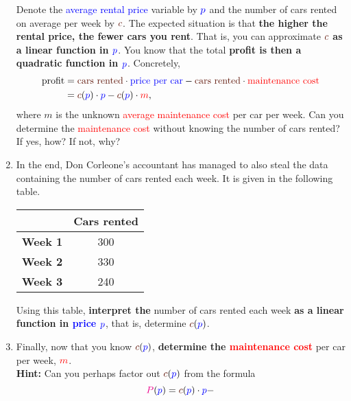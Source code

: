 \documentclass[a4paper,11pt]{article}
\newcommand{\clr}{\textcolor{red}}
\newcommand{\clb}{\textcolor{blue}}
\newcommand{\clm}{\textcolor{magenta}}
\newcommand{\clbr}{\textcolor{Sepia}}
\begin{document}
\begin{enumerate}
  Denote the \clb{average rental price} variable by $\clb{p}$ and the
  \clbr{number of cars rented} on average per week by $\clbr{c}$. The expected
  situation is that \textbf{the higher the rental price, the fewer cars you
  rent}. That is, you can approximate \textbf{$\clbr{c}$ as a linear function in
  $\clb{p}$}. You know that the total \textbf{profit is then a quadratic
  function in $\clb{p}$}. Concretely,
  \begin{equation*}
   \begin{split}
    \text{profit} &= \text{\clbr{cars rented}} \cdot \text{\clb{price per car}} -
    \text{\clbr{cars rented}} \cdot \text{\clr{maintenance cost}}\\
                  &= \clbr{c}(\clb{p}) \cdot \clb{p} - \clbr{c}(\clb{p}) \cdot
                  \clr{m}, \\
   \end{split}
  \end{equation*}
  where $m$ is the unknown \clr{average maintenance cost} per car per week. Can
  you determine the \clr{maintenance cost} without knowing the \clbr{number of
  cars rented}? If yes, how? If not, why?
 \item In the end, Don Corleone's accountant has managed to also steal the data
  containing the \clbr{number of cars rented each week}. It is given in the
  following table.
  \begin{table}[h]
   \centering
   \begin{tabular}{c|c}
    & \textbf{\clbr{Cars rented}} \\
    \toprule
    \textbf{Week 1} & 300\\
    \textbf{Week 2} & 330\\
    \textbf{Week 3} & 240
   \end{tabular}
  \end{table}
 
  Using this table, \textbf{interpret the} \clbr{number of cars rented} each
  week \textbf{as a linear function in \clb{price} $\clb{p}$}, that is, determine
  $\clbr{c}(\clb{p})$.
 \item Finally, now that you know $\clbr{c}(\clb{p})$, \textbf{determine the
  \clr{maintenance cost}} per car per week, $\clr{m}$.\\
  \textbf{Hint:} Can you perhaps factor out $\clbr{c}(\clb{p})$ from the formula
  \[
   \clm{P}(\clb{p}) = \clbr{c}(\clb{p}) \cdot \clb{p} - 
  \]
  
 
\end{enumerate}
\end{document}

